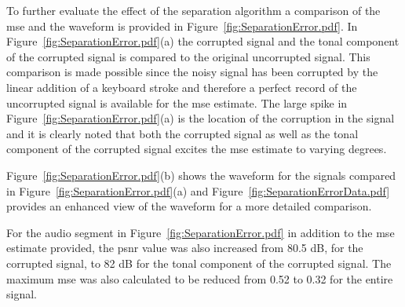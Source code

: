 To further evaluate the effect of the separation algorithm a comparison of the \gls{mse} and the waveform is provided in Figure~\ref{fig:SeparationError.pdf}. In Figure~\ref{fig:SeparationError.pdf}(a) the corrupted signal and the tonal component of the corrupted signal is compared to the original uncorrupted signal. This comparison is made possible since the noisy signal has been corrupted by the linear addition of a keyboard stroke and therefore a perfect record of the uncorrupted signal is available for the \gls{mse} estimate. The large spike in Figure~\ref{fig:SeparationError.pdf}(a) is the location of the corruption in the signal and it is clearly noted that both the corrupted signal as well as the tonal component of the corrupted signal excites the \gls{mse} estimate to varying degrees.

Figure~\ref{fig:SeparationError.pdf}(b) shows the waveform for the signals compared in Figure~\ref{fig:SeparationError.pdf}(a) and Figure~\ref{fig:SeparationErrorData.pdf} provides an enhanced view of the waveform for a more detailed comparison.

For the audio segment in Figure~\ref{fig:SeparationError.pdf} in addition to the \gls{mse} estimate provided, the \gls{psnr} value was also increased from 80.5 dB, for the corrupted signal, to 82 dB for the tonal component of the corrupted signal. The maximum \gls{mse} was also calculated to be reduced from 0.52 to 0.32 for the entire signal.

